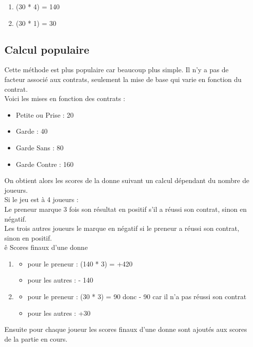 \documentclass[a4paper]{report}
\begin{document}
				\begin{enumerate}
					\item(30 * 4) = 140
					\item(30 * 1) = 30
				\end{enumerate}

			\subsection{Calcul populaire}

				Cette méthode est plus populaire car beaucoup plus simple. Il n’y a pas de facteur associé aux contrats, seulement la mise de base qui varie en fonction du contrat.\\

				Voici les mises en fonction des contrats :\\
				\begin{itemize}
				    	\item Petite ou Prise : 20
				    	\item Garde : 40
				    	\item Garde Sans : 80
				   	\item Garde Contre : 160
				\end{itemize}


				On obtient alors les scores de la donne suivant un calcul dépendant du nombre de joueurs.\\

				Si le jeu est à 4 joueurs :\\

				Le preneur marque 3 fois son résultat en positif s’il a réussi son contrat, sinon en négatif.\\
				Les trois autres joueurs le marque en négatif si le preneur a réussi son contrat, sinon en positif.\\
ê
				Scores finaux d’une donne
				\begin{enumerate}
					\item  
					\begin{itemize}
						\item pour le preneur : (140 * 3) = +420
				  		\item  pour les autres : - 140
					\end{itemize}
					\item  
					\begin{itemize}
				 		\item pour le preneur : (30 * 3) = 90 donc - 90 car il n’a pas réussi son contrat
				   		\item pour les autres : +30
					\end{itemize}
				\end{enumerate}
				Ensuite pour chaque joueur les scores finaux d’une donne sont ajoutés aux scores de la partie en cours.\\
				\\
\end{document}
